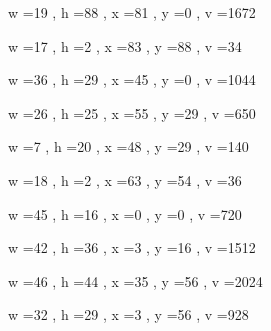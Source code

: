 \documentclass[11pt]{article}
\begin{document}
w =19 , h =88 , x =81 , y =0 , v =1672
\par
w =17 , h =2 , x =83 , y =88 , v =34
\par
w =36 , h =29 , x =45 , y =0 , v =1044
\par
w =26 , h =25 , x =55 , y =29 , v =650
\par
w =7 , h =20 , x =48 , y =29 , v =140
\par
w =18 , h =2 , x =63 , y =54 , v =36
\par
w =45 , h =16 , x =0 , y =0 , v =720
\par
w =42 , h =36 , x =3 , y =16 , v =1512
\par
w =46 , h =44 , x =35 , y =56 , v =2024
\par
w =32 , h =29 , x =3 , y =56 , v =928
\par
\newpage
\end{document}

